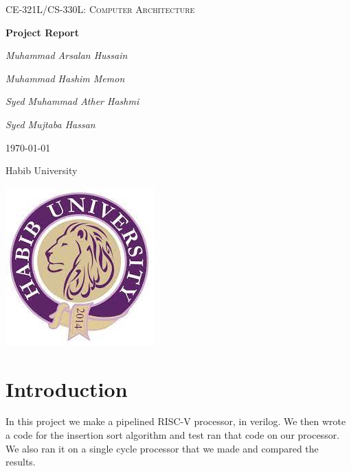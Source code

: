 \documentclass[a4paper, 12pt]{report}
\begin{document}
\begin{titlepage}
	\centering

	{\Large \textsc{CE-321L/CS-330L: Computer Architecture}\par}
	\vspace{1.5cm}
	{\huge\bfseries Project Report\par}
	\vspace{2cm}
    {\Large\itshape Muhammad Arsalan Hussain\par}
    {\Large\itshape Muhammad Hashim Memon \par}
	{\Large\itshape Syed Muhammad Ather Hashmi\par}
    {\Large\itshape Syed Mujtaba Hassan\par}
    
    \vspace{1cm}
    {\large \today\par}
    \vspace{2cm}
    {\large{Habib University} \par}
    \par\vspace{1cm}
    \includegraphics[scale = 0.8]{uhulogo.jpg}
    
	
	


	
\end{titlepage}

\section*{Introduction}
In this project we make a pipelined RISC-V processor, in verilog. 
We then wrote a code for the insertion sort algorithm and test ran that code on our processor.
We also ran it on a single cycle processor that we made and compared the results.
\end{document}

